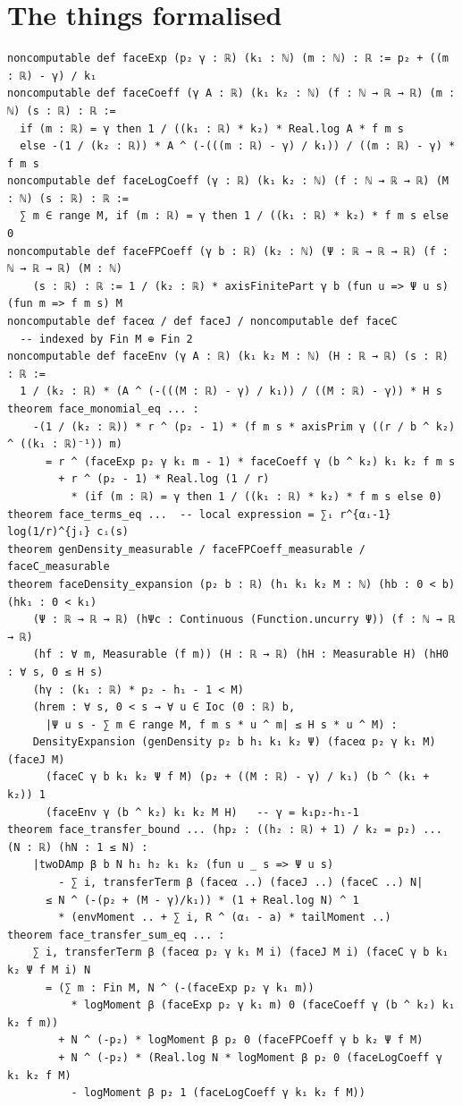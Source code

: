 \documentclass[11pt]{article}
\begin{document}
\section{The things formalised}
{\small
\begin{verbatim}
noncomputable def faceExp (p₂ γ : ℝ) (k₁ : ℕ) (m : ℕ) : ℝ := p₂ + ((m : ℝ) - γ) / k₁
noncomputable def faceCoeff (γ A : ℝ) (k₁ k₂ : ℕ) (f : ℕ → ℝ → ℝ) (m : ℕ) (s : ℝ) : ℝ :=
  if (m : ℝ) = γ then 1 / ((k₁ : ℝ) * k₂) * Real.log A * f m s
  else -(1 / (k₂ : ℝ)) * A ^ (-(((m : ℝ) - γ) / k₁)) / ((m : ℝ) - γ) * f m s
noncomputable def faceLogCoeff (γ : ℝ) (k₁ k₂ : ℕ) (f : ℕ → ℝ → ℝ) (M : ℕ) (s : ℝ) : ℝ :=
  ∑ m ∈ range M, if (m : ℝ) = γ then 1 / ((k₁ : ℝ) * k₂) * f m s else 0
noncomputable def faceFPCoeff (γ b : ℝ) (k₂ : ℕ) (Ψ : ℝ → ℝ → ℝ) (f : ℕ → ℝ → ℝ) (M : ℕ)
    (s : ℝ) : ℝ := 1 / (k₂ : ℝ) * axisFinitePart γ b (fun u => Ψ u s) (fun m => f m s) M
noncomputable def faceα / def faceJ / noncomputable def faceC
  -- indexed by Fin M ⊕ Fin 2
noncomputable def faceEnv (γ A : ℝ) (k₁ k₂ M : ℕ) (H : ℝ → ℝ) (s : ℝ) : ℝ :=
  1 / (k₂ : ℝ) * (A ^ (-(((M : ℝ) - γ) / k₁)) / ((M : ℝ) - γ)) * H s
theorem face_monomial_eq ... :
    -(1 / (k₂ : ℝ)) * r ^ (p₂ - 1) * (f m s * axisPrim γ ((r / b ^ k₂) ^ ((k₁ : ℝ)⁻¹)) m)
      = r ^ (faceExp p₂ γ k₁ m - 1) * faceCoeff γ (b ^ k₂) k₁ k₂ f m s
        + r ^ (p₂ - 1) * Real.log (1 / r)
          * (if (m : ℝ) = γ then 1 / ((k₁ : ℝ) * k₂) * f m s else 0)
theorem face_terms_eq ...  -- local expression = ∑ᵢ r^{αᵢ-1} log(1/r)^{jᵢ} cᵢ(s)
theorem genDensity_measurable / faceFPCoeff_measurable / faceC_measurable
theorem faceDensity_expansion (p₂ b : ℝ) (h₁ k₁ k₂ M : ℕ) (hb : 0 < b) (hk₁ : 0 < k₁)
    (Ψ : ℝ → ℝ → ℝ) (hΨc : Continuous (Function.uncurry Ψ)) (f : ℕ → ℝ → ℝ)
    (hf : ∀ m, Measurable (f m)) (H : ℝ → ℝ) (hH : Measurable H) (hH0 : ∀ s, 0 ≤ H s)
    (hγ : (k₁ : ℝ) * p₂ - h₁ - 1 < M)
    (hrem : ∀ s, 0 < s → ∀ u ∈ Ioc (0 : ℝ) b,
      |Ψ u s - ∑ m ∈ range M, f m s * u ^ m| ≤ H s * u ^ M) :
    DensityExpansion (genDensity p₂ b h₁ k₁ k₂ Ψ) (faceα p₂ γ k₁ M) (faceJ M)
      (faceC γ b k₁ k₂ Ψ f M) (p₂ + ((M : ℝ) - γ) / k₁) (b ^ (k₁ + k₂)) 1
      (faceEnv γ (b ^ k₂) k₁ k₂ M H)   -- γ = k₁p₂-h₁-1
theorem face_transfer_bound ... (hp₂ : ((h₂ : ℝ) + 1) / k₂ = p₂) ... (N : ℝ) (hN : 1 ≤ N) :
    |twoDAmp β b N h₁ h₂ k₁ k₂ (fun u _ s => Ψ u s)
        - ∑ i, transferTerm β (faceα ..) (faceJ ..) (faceC ..) N|
      ≤ N ^ (-(p₂ + (M - γ)/k₁)) * (1 + Real.log N) ^ 1
        * (envMoment .. + ∑ i, R ^ (αᵢ - a) * tailMoment ..)
theorem face_transfer_sum_eq ... :
    ∑ i, transferTerm β (faceα p₂ γ k₁ M i) (faceJ M i) (faceC γ b k₁ k₂ Ψ f M i) N
      = (∑ m : Fin M, N ^ (-(faceExp p₂ γ k₁ m))
          * logMoment β (faceExp p₂ γ k₁ m) 0 (faceCoeff γ (b ^ k₂) k₁ k₂ f m))
        + N ^ (-p₂) * logMoment β p₂ 0 (faceFPCoeff γ b k₂ Ψ f M)
        + N ^ (-p₂) * (Real.log N * logMoment β p₂ 0 (faceLogCoeff γ k₁ k₂ f M)
          - logMoment β p₂ 1 (faceLogCoeff γ k₁ k₂ f M))
\end{verbatim}
}
\end{document}
